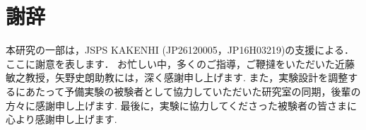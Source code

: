 \chapter*{謝辞}
本研究の一部は，JSPS KAKENHI (JP26120005，JP16H03219)の支援による．ここに謝意を表します．
お忙しい中，多くのご指導，ご鞭撻をいただいた近藤敏之教授，矢野史朗助教には，深く感謝申し上げます.
また，実験設計を調整するにあたって予備実験の被験者として協力していただいた研究室の同期，後輩の方々に感謝申し上げます.
最後に，実験に協力してくださった被験者の皆さまに心より感謝申し上げます.